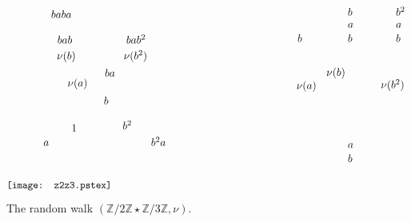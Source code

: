 \documentclass[11pt,a4paper]{article}
\theoremstyle{remark}
\def\Blackboardfont{\mathbb}
\def\Z{{\Blackboardfont Z}}
\begin{document}
\begin{figure}[ht]
\[  \begin{picture}(0,0)\texttt{[image: z2z3.pstex]}\end{picture}\setlength{\unitlength}{1184sp}\begingroup\makeatletter\ifx\SetFigFont\undefined \gdef\SetFigFont#1#2#3#4#5{\reset@font\fontsize{#1}{#2pt}\fontfamily{#3}\fontseries{#4}\fontshape{#5}\selectfont}\fi\endgroup \begin{picture}(22274,11619)(1439,-11158)
\put(17571,-3045){\makebox(0,0)[lb]{\smash{{\SetFigFont{11}{13.2}{\rmdefault}{\mddefault}{\updefault}$b$}}}}
\put(20362,-2255){\makebox(0,0)[lb]{\smash{{\SetFigFont{11}{13.2}{\rmdefault}{\mddefault}{\updefault}$a$}}}}
\put(23032,-3045){\makebox(0,0)[lb]{\smash{{\SetFigFont{11}{13.2}{\rmdefault}{\mddefault}{\updefault}$b$}}}}
\put(23032,-2255){\makebox(0,0)[lb]{\smash{{\SetFigFont{11}{13.2}{\rmdefault}{\mddefault}{\updefault}$a$}}}}
\put(17514,-5657){\makebox(0,0)[lb]{\smash{{\SetFigFont{11}{13.2}{\rmdefault}{\mddefault}{\updefault}$\nu(a)$}}}}
\put(7868,-7898){\makebox(0,0)[lb]{\smash{{\SetFigFont{11}{13.2}{\rmdefault}{\mddefault}{\updefault}$b^2$}}}}
\put(3901,-1711){\makebox(0,0)[lb]{\smash{{\SetFigFont{11}{13.2}{\rmdefault}{\mddefault}{\updefault}$baba$}}}}
\put(3472,-8814){\makebox(0,0)[lb]{\smash{{\SetFigFont{11}{13.2}{\rmdefault}{\mddefault}{\updefault}$a$}}}}
\put(22198,-5614){\makebox(0,0)[lb]{\smash{{\SetFigFont{11}{13.2}{\rmdefault}{\mddefault}{\updefault}$\nu(b^2)$}}}}
\put(20362,-1588){\makebox(0,0)[lb]{\smash{{\SetFigFont{11}{13.2}{\rmdefault}{\mddefault}{\updefault}$b$}}}}
\put(6879,-4968){\makebox(0,0)[lb]{\smash{{\SetFigFont{11}{13.2}{\rmdefault}{\mddefault}{\updefault}$ba$}}}}
\put(6826,-6511){\makebox(0,0)[lb]{\smash{{\SetFigFont{11}{13.2}{\rmdefault}{\mddefault}{\updefault}$b$}}}}
\put(5026,-8011){\makebox(0,0)[lb]{\smash{{\SetFigFont{11}{13.2}{\rmdefault}{\mddefault}{\updefault}$1$}}}}
\put(9443,-8817){\makebox(0,0)[lb]{\smash{{\SetFigFont{11}{13.2}{\rmdefault}{\mddefault}{\updefault}$b^2a$}}}}
\put(7928,-4006){\makebox(0,0)[lb]{\smash{{\SetFigFont{11}{13.2}{\rmdefault}{\mddefault}{\updefault}$\nu(b^2)$}}}}
\put(23032,-1588){\makebox(0,0)[lb]{\smash{{\SetFigFont{11}{13.2}{\rmdefault}{\mddefault}{\updefault}$b^2$}}}}
\put(20362,-3045){\makebox(0,0)[lb]{\smash{{\SetFigFont{11}{13.2}{\rmdefault}{\mddefault}{\updefault}$b$}}}}
\put(19175,-4923){\makebox(0,0)[lb]{\smash{{\SetFigFont{11}{13.2}{\rmdefault}{\mddefault}{\updefault}$\nu(b)$}}}}
\put(20362,-8929){\makebox(0,0)[lb]{\smash{{\SetFigFont{11}{13.2}{\rmdefault}{\mddefault}{\updefault}$a$}}}}
\put(20362,-9718){\makebox(0,0)[lb]{\smash{{\SetFigFont{11}{13.2}{\rmdefault}{\mddefault}{\updefault}$b$}}}}
\put(4249,-3124){\makebox(0,0)[lb]{\smash{{\SetFigFont{11}{13.2}{\rmdefault}{\mddefault}{\updefault}$bab$}}}}
\put(8071,-3128){\makebox(0,0)[lb]{\smash{{\SetFigFont{11}{13.2}{\rmdefault}{\mddefault}{\updefault}$bab^2$}}}}
\put(4216,-4009){\makebox(0,0)[lb]{\smash{{\SetFigFont{11}{13.2}{\rmdefault}{\mddefault}{\updefault}$\nu(b)$}}}}
\put(4813,-5514){\makebox(0,0)[lb]{\smash{{\SetFigFont{11}{13.2}{\rmdefault}{\mddefault}{\updefault}$\nu(a)$}}}}
\end{picture}  \]
\caption{The random walk $(\Z/2\Z \star \Z/3\Z, \nu)$.}
\label{fi-z2z3} 
\end{figure}
\end{document}

